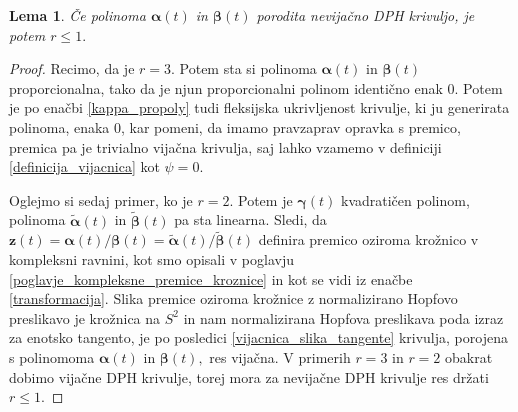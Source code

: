 \documentclass[12pt,a4paper,twoside]{article}
\theoremstyle{definition} %
\theoremstyle{plain} %
\newtheorem{lema}[definicija]{Lema}
\numberwithin{equation}{section}  %
\newcommand{\zV}{\mathbf{z}}
\newcommand{\balpha}{\boldsymbol \alpha}
\newcommand{\bbeta}{\boldsymbol \beta}
\newcommand{\bgamma}{\boldsymbol \gamma}
\newcommand{\btalpha}{\tilde{\boldsymbol \alpha}}
\newcommand{\btbeta}{\tilde{\boldsymbol \beta}}
\begin{document}
\begin{lema}
	\label{lema_1}
	Če polinoma $\balpha(t)$ in $\bbeta(t)$ porodita nevijačno DPH krivuljo, je potem $r \leq 1.$
\end{lema}
\begin{proof}
	Recimo, da je $r=3.$ Potem sta si polinoma $\balpha(t)$ in $\bbeta(t)$ proporcionalna, tako da je njun proporcionalni polinom identično enak 0. Potem je po enačbi \eqref{kappa_propoly} tudi fleksijska ukrivljenost krivulje, ki ju generirata polinoma, enaka 0, kar pomeni, da imamo pravzaprav opravka s premico, premica pa je trivialno vijačna krivulja, saj lahko vzamemo v definiciji \ref{definicija_vijacnica} kot $\psi=0.$
	
	Oglejmo si sedaj primer, ko je $r=2.$ Potem je $\bgamma(t)$ kvadratičen polinom, polinoma $\btalpha(t)$ in $\btbeta(t)$ pa sta linearna. Sledi, da $\zV(t)=\balpha(t)/\bbeta(t)=\btalpha(t)/\btbeta(t)$ definira premico oziroma krožnico v kompleksni ravnini, kot smo opisali v poglavju \ref{poglavje_kompleksne_premice_kroznice} in kot se vidi iz enačbe \eqref{transformacija}. Slika premice oziroma krožnice z normalizirano Hopfovo preslikavo je krožnica na $S^2$ in nam normalizirana Hopfova preslikava poda izraz za enotsko tangento, je po posledici \ref{vijacnica_slika_tangente} krivulja, porojena s polinomoma $\balpha(t)$ in $\bbeta(t),$ res vijačna. V primerih $r=3$ in $r=2$ obakrat dobimo vijačne DPH krivulje, torej mora za nevijačne DPH krivulje res držati $r \leq 1.$
\end{proof}
\end{document}
